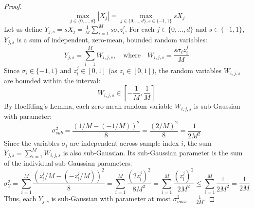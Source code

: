 \documentclass{article}
\theoremstyle{plain}
\theoremstyle{definition}
\theoremstyle{remark}
\begin{document}
\begin{proof}
\begin{equation}
\max_{j \in \{0, \dots, d\}} |X_j| = \max_{j \in \{0, \dots, d\}, s \in \{-1, 1\}} s X_j
\end{equation}
Let us define $Y_{j, s} = s X_j = \frac{1}{M} \sum_{i=1}^M s \sigma_i z_i^j$. For each $j \in \{0, \dots, d\}$ and $s \in \{-1, 1\}$, $Y_{j, s}$ is a sum of independent, zero-mean, bounded random variables:
\begin{equation}
Y_{j, s} = \sum_{i=1}^M W_{i, j, s}, \quad \text{where} \quad W_{i, j, s} = \frac{s \sigma_i z_i^j}{M}
\end{equation}
Since $\sigma_i \in \{-1, 1\}$ and $z_i^j \in [0, 1]$ (as $z_i \in [0, 1]$), the random variables $W_{i, j, s}$ are bounded within the interval:
\begin{equation}
W_{i, j, s} \in \left[ -\frac{1}{M}, \frac{1}{M} \right]
\end{equation}
By Hoeffding's Lemma, each zero-mean random variable $W_{i, j, s}$ is sub-Gaussian with parameter:
\begin{equation}
\sigma_{sub}^2 = \frac{(1/M - (-1/M))^2}{8} = \frac{(2/M)^2}{8} = \frac{1}{2 M^2}
\end{equation}
Since the variables $\sigma_i$ are independent across sample index $i$, the sum $Y_{j, s} = \sum_{i=1}^M W_{i, j, s}$ is also sub-Gaussian. Its sub-Gaussian parameter is the sum of the individual sub-Gaussian parameters:
\begin{equation}
\sigma_Y^2 = \sum_{i=1}^M \frac{(z_i^j/M - (-z_i^j/M))^2}{8} = \sum_{i=1}^M \frac{(2 z_i^j)^2}{8 M^2} = \sum_{i=1}^M \frac{(z_i^j)^2}{2 M^2} \le \sum_{i=1}^M \frac{1}{2 M^2} = \frac{1}{2 M}
\end{equation}
Thus, each $Y_{j, s}$ is sub-Gaussian with parameter at most $\sigma_{max}^2 = \frac{1}{2 M}$.


\end{proof}
\end{document}
